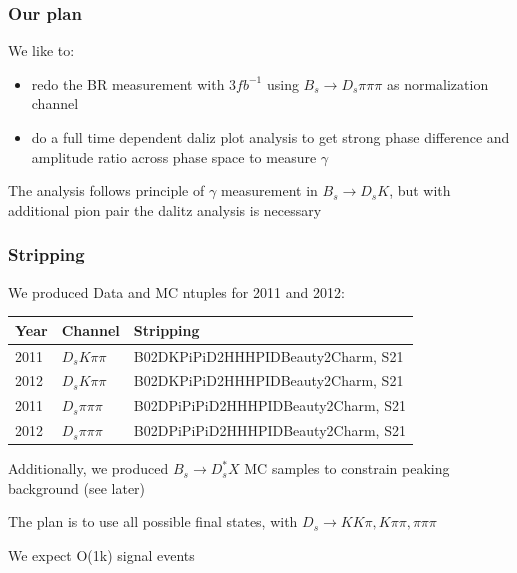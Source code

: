 \documentclass[]{beamer}
\begin{document}
\begin{frame}
\frametitle{Our plan}

We like to:
\begin{itemize}

\item redo the BR measurement with $3 fb^{-1}$ using $B_{s}\rightarrow D_{s}\pi\pi\pi$ as normalization channel

\item do a full time dependent daliz plot analysis to get strong phase difference and amplitude ratio across phase space to measure $\gamma$


\end{itemize} 

\bigskip

The analysis follows principle of $\gamma$ measurement in $B_{s}\rightarrow D_{s}K$, but with additional pion pair the dalitz analysis is necessary

\end{frame}


\begin{frame}
\frametitle{Stripping}

We produced Data and MC ntuples for 2011 and 2012:

\begin{tabular}{l|l|l}
Year & Channel & Stripping \\ \hline
2011 & $D_{s}K\pi\pi$ & B02DKPiPiD2HHHPIDBeauty2Charm, S21 \\
2012 & $D_{s}K\pi\pi$ & B02DKPiPiD2HHHPIDBeauty2Charm, S21\\
2011 & $D_{s}\pi\pi\pi$ & B02DPiPiPiD2HHHPIDBeauty2Charm, S21 \\
2012 & $D_{s}\pi\pi\pi$ & B02DPiPiPiD2HHHPIDBeauty2Charm, S21\\
\end{tabular} \newline

Additionally, we produced $B_{s}\rightarrow D_{s}^{*}X$ MC samples to constrain peaking background (see later) \newline

The plan is to use all possible final states, with $D_{s}\rightarrow KK\pi,K\pi\pi,\pi\pi\pi$ \newline

We expect O(1k) signal events

\end{frame}
\end{document}

